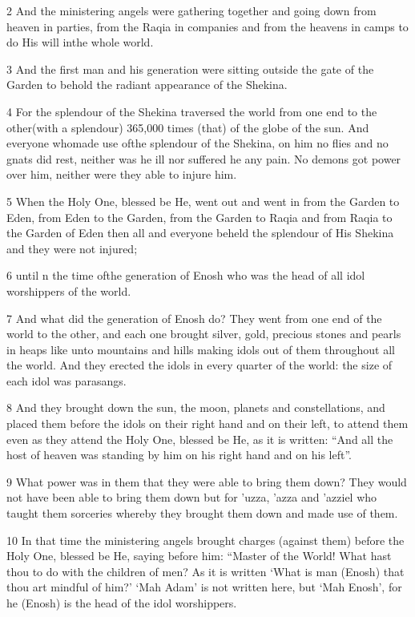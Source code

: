 \par 2 And the ministering angels were gathering together and going down from heaven in parties, from the Raqia in companies and from the heavens in camps to do His will inthe whole world. 

\par 3 And the first man and his generation were sitting outside the gate of the Garden to behold the radiant appearance of the Shekina. 

\par 4 For the splendour of the Shekina traversed the world from one end to the other(with a splendour) 365,000 times (that) of the globe of the sun. And everyone whomade use ofthe splendour of the Shekina, on him no flies and no gnats did rest, neither was he ill nor suffered he any pain. No demons got power over him, neither were they able to injure him. 

\par 5 When the Holy One, blessed be He, went out and went in from the Garden to Eden, from Eden to the Garden, from the Garden to Raqia and from Raqia to the Garden of Eden then all and everyone beheld the splendour of His Shekina and they were not injured;

\par 6 until n the time ofthe generation of Enosh who was the head of all idol worshippers of the world.

\par 7 And what did the generation of Enosh do? They went from one end of the world to the other, and each one brought silver, gold, precious stones and pearls in heaps like unto mountains and hills making idols out of them throughout all the world. And they erected the idols in every quarter of the world: the size of each idol was parasangs.

\par 8 And they brought down the sun, the moon, planets and constellations, and placed them before the idols on their right hand and on their left, to attend them even as they attend the Holy One, blessed be He, as it is written: “And all the host of heaven was standing by him on his right hand and on his left”. 

\par 9 What power was in them that they were able to bring them down? They would not have been able to bring them down but for 'uzza, 'azza and 'azziel who taught them sorceries whereby they brought them down and made use of them. 

\par 10 In that time the ministering angels brought charges (against them) before the Holy One, blessed be He, saying before him: “Master of the World! What hast thou to do with the children of men? As it is written ‘What is man (Enosh) that thou art mindful of him?’ ‘Mah Adam’ is not written here, but ‘Mah Enosh’, for he (Enosh) is the head of the idol worshippers.

